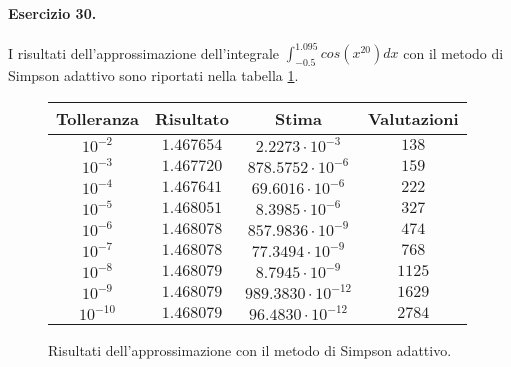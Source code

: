 \paragraph{Esercizio 30.} I risultati dell'approssimazione dell'integrale $\int_{-0.5}^{1.095} cos(x^{20})dx$ con il metodo di Simpson adattivo sono riportati nella tabella \ref{fig:adaptive}.

\begin{figure}
  \centering
  \begin{tabular}{|c|c|c|c|}
    \hline
    Tolleranza & Risultato & Stima & Valutazioni \\
    \hline\hline
    $10^{-2}$ & $1.467654$ & $2.2273 \cdot 10^{-3}$ & $138$ \\
    \hline
    $10^{-3}$ & $1.467720$ & $878.5752 \cdot 10^{-6}$ & $159$ \\
    \hline
    $10^{-4}$ & $1.467641$ & $69.6016 \cdot 10^{-6}$ & $222$ \\
    \hline
    $10^{-5}$ & $1.468051$ & $8.3985 \cdot 10^{-6}$ & $327$ \\
    \hline
    $10^{-6}$ & $1.468078$ & $857.9836 \cdot 10^{-9}$ & $474$ \\
    \hline
    $10^{-7}$ & $1.468078$ & $77.3494 \cdot 10^{-9}$ & $768$ \\
    \hline
    $10^{-8}$ & $1.468079$ & $8.7945 \cdot 10^{-9}$ & $1125$ \\
    \hline
    $10^{-9}$ & $1.468079$ & $989.3830 \cdot 10^{-12}$ & $1629$ \\
    \hline
    $10^{-10}$ & $1.468079$ & $96.4830 \cdot 10^{-12}$ & $2784$ \\
    \hline
  \end{tabular}
  \caption{Risultati dell'approssimazione con il metodo di Simpson adattivo.}
  \label{fig:adaptive}
\end{figure}